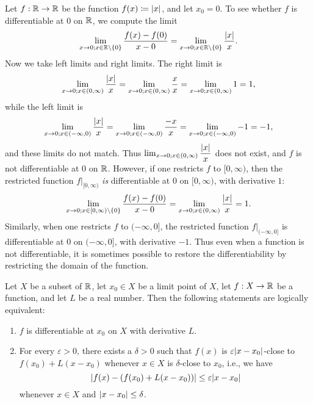 \begin{eg}\label{i:10.1.6}
  Let \(f : \mathbb{R} \to \mathbb{R}\) be the function \(f(x) \coloneqq \left\lvert x\right\rvert\), and let \(x_0 = 0\).
  To see whether \(f\) is differentiable at \(0\) on \(\mathbb{R}\), we compute the limit
  \[
    \lim_{x \to 0 ; x \in \mathbb{R} \setminus \left\lbrace0\right\rbrace} \dfrac{f(x) - f(0)}{x - 0} = \lim_{x \to 0 ; x \in \mathbb{R} \setminus \left\lbrace0\right\rbrace} \dfrac{\left\lvert x\right\rvert}{x}.
  \]
  Now we take left limits and right limits.
  The right limit is
  \[
    \lim_{x \to 0 ; x \in (0, \infty)} \dfrac{\left\lvert x\right\rvert}{x} = \lim_{x \to 0 ; x \in (0, \infty)} \dfrac{x}{x} = \lim_{x \to 0 ; x \in (0, \infty)} 1 = 1,
  \]
  while the left limit is
  \[
    \lim_{x \to 0 ; x \in (-\infty, 0)} \dfrac{\left\lvert x\right\rvert}{x} = \lim_{x \to 0 ; x \in (-\infty, 0)} \dfrac{-x}{x} = \lim_{x \to 0 ; x \in (-\infty, 0)} -1 = -1,
  \]
  and these limits do not match.
  Thus \(\lim_{x \to 0 ; x \in (0, \infty)} \dfrac{\left\lvert x\right\rvert}{x}\) does not exist, and \(f\) is not differentiable at \(0\) on \(\mathbb{R}\).
  However, if one restricts \(f\) to \([0, \infty)\), then the restricted function \(f|_{[0, \infty)}\) \emph{is} differentiable at \(0\) on \([0, \infty)\), with derivative \(1\):
  \[
  \lim_{x \to 0 ; x \in [0, \infty) \setminus \left\lbrace0\right\rbrace} \dfrac{f(x) - f(0)}{x - 0} = \lim_{x \to 0 ; x \in (0, \infty)} \dfrac{\left\lvert x\right\rvert}{x} = 1.
    \]
    Similarly, when one restricts \(f\) to \((-\infty, 0]\), the restricted function \(f|_{(-\infty, 0]}\) is differentiable at \(0\) on \((-\infty, 0]\), with derivative \(-1\).
  Thus even when a function is not differentiable, it is sometimes possible to restore the differentiability by restricting the domain of the function.
\end{eg}

\begin{prop}\label{i:10.1.7}
  Let \(X\) be a subset of \(\mathbb{R}\), let \(x_0 \in X\) be a limit point of \(X\), let \(f : X \to \mathbb{R}\) be a function, and let \(L\) be a real number.
  Then the following statements are logically equivalent:
  \begin{enumerate}
    \item \(f\) is differentiable at \(x_0\) on \(X\) with derivative \(L\).
    \item For every \(\varepsilon > 0\), there exists a \(\delta > 0\) such that \(f(x)\) is \(\varepsilon \abs{x - x_0}\)-close to \(f(x_0) + L(x - x_0)\) whenever \(x \in X\) is \(\delta\)-close to \(x_0\), i.e., we have
          \[
            \abs{f(x) - (f(x_0) + L(x - x_0))} \leq \varepsilon \abs{x - x_0}
          \]
          whenever \(x \in X\) and \(\left\lvert x - x_0\right\rvert \leq \delta\).
  \end{enumerate}
\end{prop}

